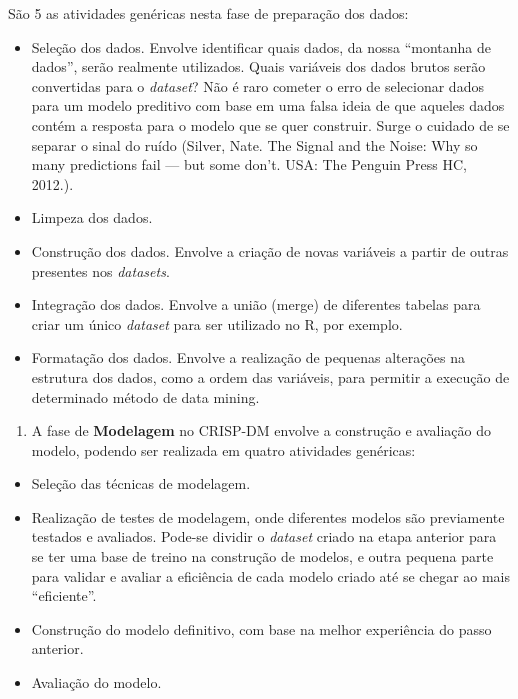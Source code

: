 \documentclass[]{article}
\providecommand{\tightlist}{%
  \setlength{\itemsep}{0pt}\setlength{\parskip}{0pt}}
\begin{document}
São 5 as atividades genéricas nesta fase de preparação dos dados:

\begin{itemize}
\item
  Seleção dos dados. Envolve identificar quais dados, da nossa
  ``montanha de dados'', serão realmente utilizados. Quais variáveis dos
  dados brutos serão convertidas para o \emph{dataset}? Não é raro
  cometer o erro de selecionar dados para um modelo preditivo com base
  em uma falsa ideia de que aqueles dados contém a resposta para o
  modelo que se quer construir. Surge o cuidado de se separar o sinal do
  ruído (Silver, Nate. The Signal and the Noise: Why so many predictions
  fail --- but some don't. USA: The Penguin Press HC, 2012.).
\item
  Limpeza dos dados.
\item
  Construção dos dados. Envolve a criação de novas variáveis a partir de
  outras presentes nos \emph{datasets}.
\item
  Integração dos dados. Envolve a união (merge) de diferentes tabelas
  para criar um único \emph{dataset} para ser utilizado no R, por
  exemplo.
\item
  Formatação dos dados. Envolve a realização de pequenas alterações na
  estrutura dos dados, como a ordem das variáveis, para permitir a
  execução de determinado método de data mining.
\end{itemize}

\begin{enumerate}
\def\labelenumi{\arabic{enumi}.}
\setcounter{enumi}{3}
\tightlist
\item
  A fase de \textbf{Modelagem} no CRISP-DM envolve a construção e
  avaliação do modelo, podendo ser realizada em quatro atividades
  genéricas:
\end{enumerate}

\begin{itemize}
\item
  Seleção das técnicas de modelagem.
\item
  Realização de testes de modelagem, onde diferentes modelos são
  previamente testados e avaliados. Pode-se dividir o \emph{dataset}
  criado na etapa anterior para se ter uma base de treino na construção
  de modelos, e outra pequena parte para validar e avaliar a eficiência
  de cada modelo criado até se chegar ao mais ``eficiente''.
\item
  Construção do modelo definitivo, com base na melhor experiência do
  passo anterior.
\item
  Avaliação do modelo.
\end{itemize}
\end{document}
